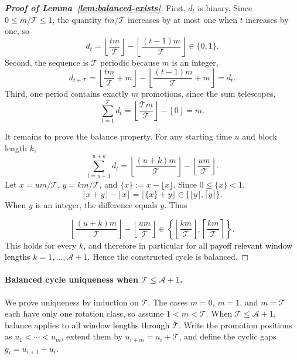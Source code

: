 \begin{proof}[\normalfont\bfseries Proof of Lemma~\ref{lem:balanced-exists}]
    First, \(d_t\) is binary. Since \(0\le m/\mathcal T\le1\), the quantity \(tm/\mathcal T\) increases by at most one when \(t\) increases by one, so
    \[
        d_t=\left\lfloor \frac{tm}{\mathcal T}\right\rfloor-\left\lfloor \frac{(t-1)m}{\mathcal T}\right\rfloor
        \in\{0,1\}.
    \]
    Second, the sequence is \(\mathcal T\) periodic because \(m\) is an integer,
    \[
        d_{t+\mathcal T}
        =
        \left\lfloor \frac{tm}{\mathcal T}+m\right\rfloor
        -
        \left\lfloor \frac{(t-1)m}{\mathcal T}+m\right\rfloor
        =
        d_t.
    \]
    Third, one period contains exactly \(m\) promotions, since the sum telescopes,
    \[
        \sum_{t=1}^{\mathcal T}d_t
        =
        \left\lfloor \frac{\mathcal T m}{\mathcal T}\right\rfloor-\left\lfloor 0\right\rfloor
        =
        m.
    \]

    It remains to prove the balance property. For any starting time \(u\) and block length \(k\),
    \[
        \sum_{t=u+1}^{u+k}d_t
        =
        \left\lfloor \frac{(u+k)m}{\mathcal T}\right\rfloor
        -
        \left\lfloor \frac{um}{\mathcal T}\right\rfloor.
    \]
    Let \(x=um/\mathcal T\), \(y=km/\mathcal T\), and \(\{x\}:=x-\lfloor x\rfloor\). Since \(0\le\{x\}<1\),
    \[
        \lfloor x+y\rfloor-\lfloor x\rfloor
        =\lfloor\{x\}+y\rfloor
        \in\{\lfloor y\rfloor,\lceil y\rceil\}.
    \]
    When \(y\) is an integer, the difference equals \(y\). Thus

    \[
        \left\lfloor \frac{(u+k)m}{\mathcal T}\right\rfloor
        -
        \left\lfloor \frac{um}{\mathcal T}\right\rfloor
        \in
        \left\{
            \left\lfloor \frac{km}{\mathcal T}\right\rfloor,
            \left\lceil \frac{km}{\mathcal T}\right\rceil
        \right\}.
    \]
    This holds for every \(k\), and therefore in particular for all \textcolor{black}{payoff relevant window lengths} \(k=1,\ldots,\mathcal A+1\). Hence the constructed cycle is balanced.
\end{proof}

\paragraph{Balanced cycle uniqueness when \texorpdfstring{\(\mathcal T\le \mathcal A+1\)}{cycle length <= memory length + 1}.}
We prove uniqueness by induction on \(\mathcal T\). The cases \(m=0\), \(m=1\), and \(m=\mathcal T\) each have only one rotation class, so assume \(1<m<\mathcal T\). When \(\mathcal T\le\mathcal A+1\), balance applies to \textcolor{black}{all window lengths through \(\mathcal T\)}. Write the promotion positions as \(u_1<\cdots<u_m\), extend them by \(u_{i+m}=u_i+\mathcal T\), and define the cyclic gaps \(g_i=u_{i+1}-u_i\).

